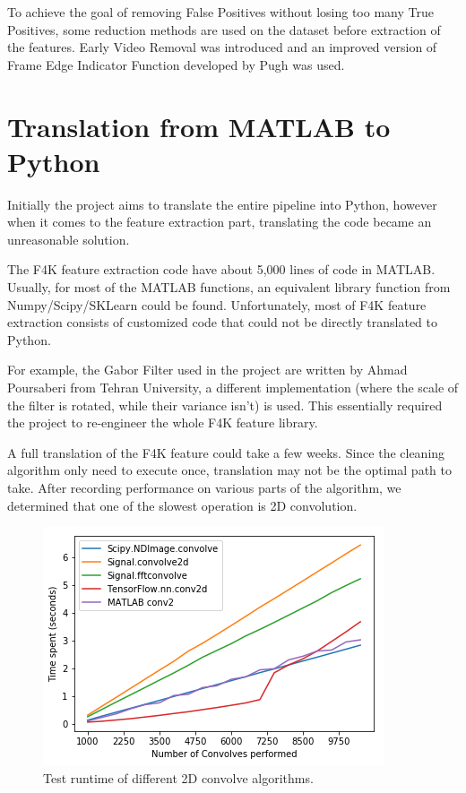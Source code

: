 \documentclass[bsc,logo,twoside,fullspacing,parskip]{infthesis}
\begin{document}
To achieve the goal of removing False Positives without losing too many True Positives, some reduction methods are used on the dataset before extraction of the features. 
Early Video Removal was introduced and an improved version of Frame Edge Indicator Function developed by Pugh was used.

\section{Translation from MATLAB to Python}
\label{sec:translate}

Initially the project aims to translate the entire pipeline into Python, however when it comes to the feature extraction part, translating the code became an unreasonable solution.

The F4K feature extraction code have about 5,000 lines of code in MATLAB.
Usually, for most of the MATLAB functions, an equivalent library function from Numpy/Scipy/SKLearn could be found.
Unfortunately, most of F4K feature extraction consists of customized code that could not be directly translated to Python.

For example, the Gabor Filter used in the project are written by Ahmad Poursaberi from Tehran University, a different implementation (where the scale of the filter is rotated, while their variance isn't) is used. 
This essentially required the project to re-engineer the whole F4K feature library.

A full translation of the F4K feature could take a few weeks. Since the cleaning algorithm only need to execute once, translation may not be the optimal path to take. After recording performance on various parts of the algorithm, we determined that one of the slowest operation is 2D convolution.

\begin{figure}[h]
    \centering
    \includegraphics[scale=0.5]{graph/benchmark.png}
    \caption{Test runtime of different 2D convolve algorithms.}
    \label{fig:benchmark}
\end{figure}
\end{document}
